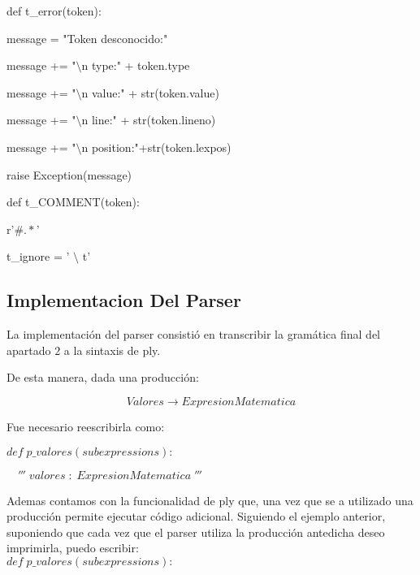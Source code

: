 \begin{multicols}{2}

def t\_error(token):

 \hspace{2mm}message = "Token desconocido:"
    
\hspace{2mm}message += "$\setminus$n type:" + token.type
    
\hspace{2mm}message += "$\setminus$n value:" + str(token.value)
    
\hspace{2mm}message += "$\setminus$n line:" + str(token.lineno)
    
\hspace{2mm}message += "$\setminus$n position:"+str(token.lexpos)
    
\hspace{2mm}raise Exception(message)
  

\columnbreak

def t\_COMMENT(token):

\hspace{2mm}    r'$\#.*$'

t\_ignore  = ' $\setminus$ t'

\end{multicols}

\subsection{Implementacion Del Parser}

La implementación del parser consistió en transcribir la gramática final del apartado $2$ a la sintaxis de ply.

De esta manera, dada una producción:

$$Valores \rightarrow ExpresionMatematica$$

Fue necesario reescribirla como:


$def\; p\_valores(subexpressions):$

$\quad'''\; valores\; :\; ExpresionMatematica\;'''$


Ademas contamos con la funcionalidad de ply que, una vez que se a utilizado una producción permite ejecutar código adicional. Siguiendo el ejemplo anterior, suponiendo que cada vez que el parser utiliza la producción antedicha deseo imprimirla, puedo escribir:
\\

$def\; p\_valores(subexpressions):$

